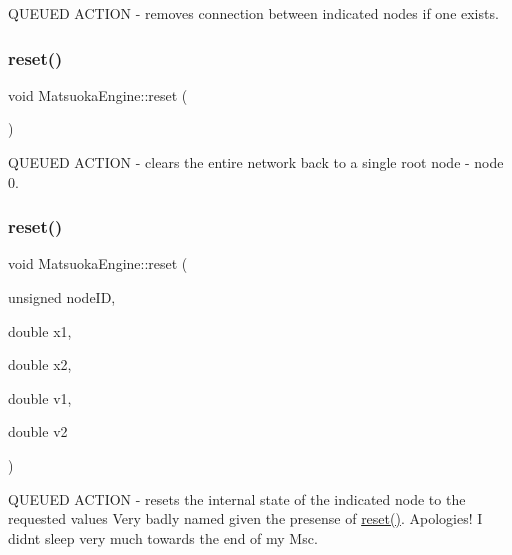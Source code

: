 Q\+U\+E\+U\+ED A\+C\+T\+I\+ON -\/ removes connection between indicated nodes if one exists. 

\mbox{\label{classMatsuokaEngine_a627983362b1b84ee5d3c72d7540d9a47}} 
\subsubsection{\texorpdfstring{reset()}{reset()}\hspace{0.1cm}{\footnotesize\ttfamily [1/2]}}
{\footnotesize\ttfamily void Matsuoka\+Engine\+::reset (\begin{DoxyParamCaption}{ }\end{DoxyParamCaption})}



Q\+U\+E\+U\+ED A\+C\+T\+I\+ON -\/ clears the entire network back to a single root node -\/ node 0. 

\mbox{\label{classMatsuokaEngine_aa2a425173fed2f3f30c1fa5c6e680764}} 
\subsubsection{\texorpdfstring{reset()}{reset()}\hspace{0.1cm}{\footnotesize\ttfamily [2/2]}}
{\footnotesize\ttfamily void Matsuoka\+Engine\+::reset (\begin{DoxyParamCaption}\item[{unsigned}]{node\+ID,  }\item[{double}]{x1,  }\item[{double}]{x2,  }\item[{double}]{v1,  }\item[{double}]{v2 }\end{DoxyParamCaption})}

Q\+U\+E\+U\+ED A\+C\+T\+I\+ON -\/ resets the internal state of the indicated node to the requested values Very badly named given the presense of \mbox{\hyperlink{classMatsuokaEngine_a627983362b1b84ee5d3c72d7540d9a47}{reset()}}. Apologies! I didn\textquotesingle{}t sleep very much towards the end of my Msc. \mbox{\label{classMatsuokaEngine_a19fd8a9446e6bea6986d8de5c5c7bfd1}} 
